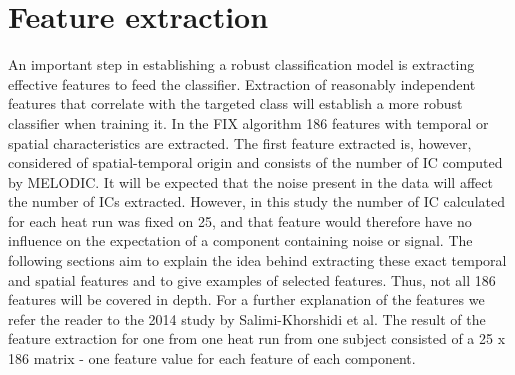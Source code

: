 \section{Feature extraction}
An important step in establishing a robust classification model is extracting effective features to feed the classifier. Extraction of reasonably independent features that correlate with the targeted class will establish a more robust classifier when training it. In the FIX algorithm 186 features with temporal or spatial characteristics are extracted. The first feature extracted is, however, considered of spatial-temporal origin and consists of the number of IC computed by MELODIC. It will be expected that the noise present in the data will affect the number of ICs extracted. \cite{Salimi-Khorshidi2014} However, in this study the number of IC calculated for each heat run was fixed on 25, and that feature would therefore have no influence on the expectation of a component containing noise or signal. 
The following sections aim to explain the idea behind extracting these exact temporal and spatial features and to give examples of selected features. Thus, not all 186 features will be covered in depth. For a further explanation of the features we refer the reader to the 2014 study by Salimi-Khorshidi et al. \cite{Salimi-Khorshidi2014} The result of the feature extraction for one from one heat run from one subject consisted of a 25 x 186 matrix - one feature value for each feature of each component.

